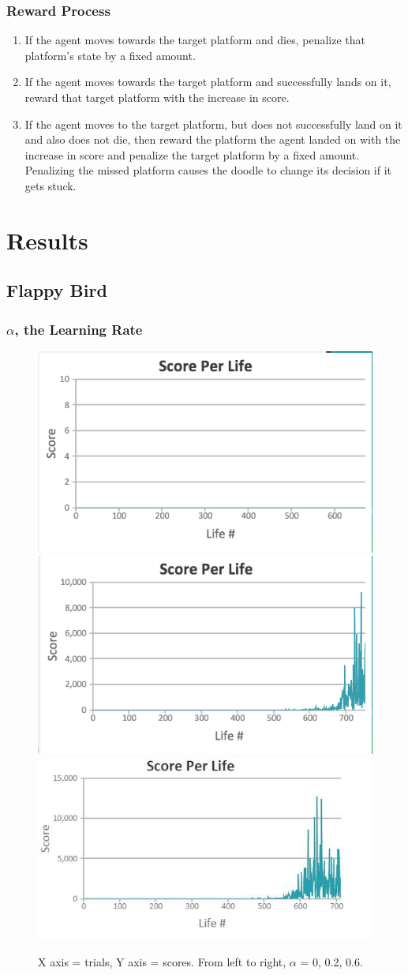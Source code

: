 \documentclass[a4paper, 12pt]{article}
\begin{document}
\subsubsection{Reward Process}
\begin{enumerate}
\setlength{\itemsep}{0.2pt}
\item If the agent moves towards the target platform and dies, penalize that platform's state by a fixed amount.
\item If the agent moves towards the target platform and successfully lands on it, reward that target platform with the increase in score.
\item If the agent moves to the target platform, but does not successfully land on it and also does not die, then reward the platform the agent landed on with the increase in score and penalize the target platform by a fixed amount. Penalizing the missed platform causes the doodle to change its decision if it gets stuck.
\end{enumerate}

\section{Results}
\subsection{Flappy Bird}

\subsubsection{$\alpha$, the Learning Rate}

\begin{figure}[H]

\centering
\includegraphics[width=.3\textwidth]{alpha0_0.png}\hfill
\includegraphics[width=.3\textwidth]{alpha0_2.png}\hfill
\includegraphics[width=.3\textwidth]{alpha0_6.png}\hfill
\caption{X axis = trials, Y axis = scores. From left to right, $\alpha$ = 0, 0.2, 0.6.}

\end{figure}
\end{document}
